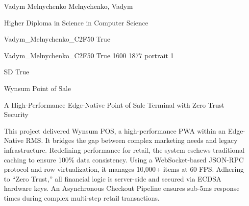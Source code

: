 
\begingroup{}\relax



\def\Key{Vadym_Melnychenko_C2F50}

{Vadym Melnychenko}
{Melnychenko, Vadym}

{Higher Diploma in Science in Computer Science}

{Vadym_Melnychenko_C2F50}
{True}

{Vadym_Melnychenko_C2F50}
{True}
{1600}
{1877}
{portrait}
{1}

{SD}
{True}

{Wynsum Point of Sale}

{A High-Performance Edge-Native Point of Sale Terminal with Zero Trust Security}

{This project delivered Wynsum POS, a high-performance PWA within an Edge-Native RMS. It bridges the gap between complex marketing needs and legacy infrastructure. Redefining performance for retail, the system eschews traditional caching to ensure 100\% data consistency. Using a WebSocket-based JSON-RPC protocol and row virtualization, it manages 10,000+ items at 60 FPS. Adhering to \textquotedblleft{}Zero Trust,\textquotedblright{} all financial logic is server-side and secured via ECDSA hardware keys. An Asynchronous Checkout Pipeline ensures sub-5ms response times during complex multi-step retail transactions.}

